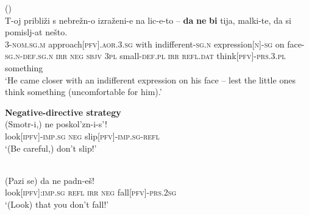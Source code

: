 \documentclass[output=paper,colorlinks,citecolor=brown]{langscibook}
\begin{document}
\ea\label{ex:wiemer2} \textnormal{ (\citealt[147]{Ivanova2014})}\\
\gll T-oj približi s nebrežn-o izraženi-e na lic-e-to -- \textbf{da} \textbf{ne} \textbf{bi} tija, malki-te, da si pomislj-at nešto. \\
3-\textsc{nom.sg.m} approach\textsc{[pfv].aor.3.sg} with indifferent-\textsc{sg.n} expression\textsc{[n]-sg} on face-\textsc{sg.n-def.sg.n} {} \textsc{irr} \textsc{neg} \textsc{sbjv} \textsc{3pl} small-\textsc{def.pl} \textsc{irr} \textsc{refl.dat} think\textsc{[pfv]-prs.3.pl} something \\
\glt `He came closer with an indifferent expression on his face -- lest the little ones think something (uncomfortable for him).'
\z

\noindent \textbf{Negative-directive strategy}
\ea\label{ex:wiemer3}
\textnormal{} \\
\gll (Smotr-i,) ne poskol'zn-i-s'! \\
look\textsc{[ipfv]-imp.sg} \textsc{neg} slip\textsc{[pfv]-imp.sg-refl} \\
\glt `(Be careful,) don't slip!'
\z

\ea \textnormal{} \\
\label{ex:wiemer4}
\gll (Pazi se) da ne padn-eš! \\
look\textsc{[ipfv]:imp.sg} \textsc{refl} \textsc{irr} \textsc{neg} fall\textsc{[pfv]-prs.2sg} \\
\glt `(Look) that you don't fall!'
\z
\end{document}
